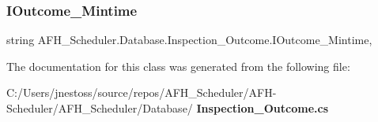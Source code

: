 \mbox{\label{class_a_f_h___scheduler_1_1_database_1_1_inspection___outcome_aa84aedc29017913bd50172bcd5adb489}} 
\subsubsection{IOutcome\_Mintime}
{\footnotesize\ttfamily string A\+F\+H\+\_\+\+Scheduler.\+Database.\+Inspection\+\_\+\+Outcome.\+I\+Outcome\+\_\+\+Mintime\hspace{0.3cm}{\ttfamily [get]}, {\ttfamily [set]}}



The documentation for this class was generated from the following file\+:\begin{DoxyCompactItemize}
\item 
C\+:/\+Users/jnestoss/source/repos/\+A\+F\+H\+\_\+\+Scheduler/\+A\+F\+H-\/\+Scheduler/\+A\+F\+H\+\_\+\+Scheduler/\+Database/\textbf{ Inspection\+\_\+\+Outcome.\+cs}\end{DoxyCompactItemize}
